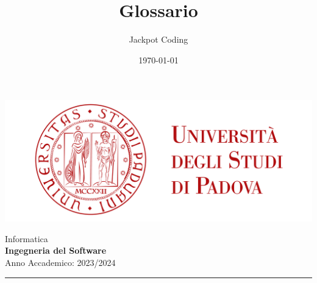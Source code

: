 \documentclass[5pt]{article}
\title{Glossario}
\author{Jackpot Coding}
\date{\today}
\begin{document}


    \vspace{8pt}
    \includegraphics[scale=0.2]{UNIPDFull.png}

\vspace{30pt}

\begin{minipage}[t]{0.48\textwidth}
        \begin{flushleft}
            Informatica\\
            \vspace{5pt}
            \textbf{\LARGE Ingegneria del Software}\\
            Anno Accademico: 2023/2024
        \end{flushleft}
\end{minipage}


\vspace{5px}


\rule{\textwidth}{5pt}
\end{document}
